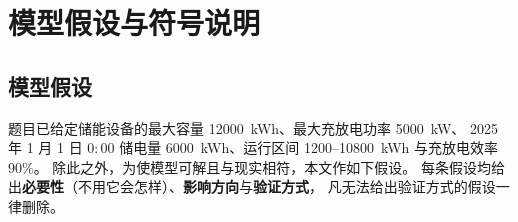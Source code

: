
\section{模型假设与符号说明}

\subsection{模型假设}

题目已给定储能设备的最大容量 12000~kWh、最大充放电功率 5000~kW、
2025 年 1 月 1 日 \(0{:}00\) 储电量 6000~kWh、运行区间 1200--10800~kWh 与充放电效率 90\%。
除此之外，为使模型可解且与现实相符，本文作如下假设。
每条假设均给出\textbf{必要性}（不用它会怎样）、\textbf{影响方向}与\textbf{验证方式}，
凡无法给出验证方式的假设一律删除。

